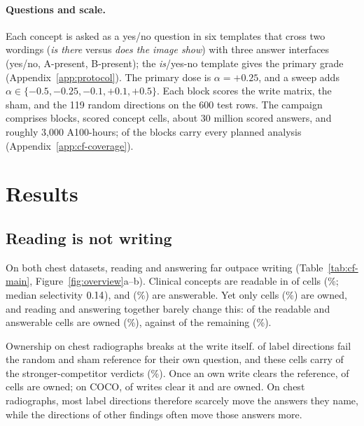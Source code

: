 \documentclass{article}
\begin{document}
\paragraph{Questions and scale.}
Each concept is asked as a yes/no question in six templates that cross two wordings (\emph{is there} versus \emph{does the image show}) with three answer interfaces (yes/no, A-present, B-present); the \emph{is}/yes-no template gives the primary grade (Appendix~\ref{app:protocol}). The primary dose is $\alpha=+0.25$, and a sweep adds $\alpha\in\{-0.5,-0.25,-0.1,+0.1,+0.5\}$. Each block scores the write matrix, the sham, and the 119 random directions on the 600 test rows. The campaign comprises \cfBlocks{} blocks, \cfCells{} scored concept cells, about 30 million scored answers, and roughly 3{,}000 A100-hours; \cfCoverageBlocksAllSeven{} of the \cfBlocks{} blocks carry every planned analysis (Appendix~\ref{app:cf-coverage}).

\section{Results}
\label{sec:results}

\subsection{Reading is not writing}
\label{sec:headline}

On both chest datasets, reading and answering far outpace writing (Table~\ref{tab:cf-main}, Figure~\ref{fig:overview}a--b). Clinical concepts are readable in \cfChestReadable{} of \cfChestReadableN{} cells (\cfChestReadablePct\%; median selectivity $0.14$), and \cfChestAnswerable{} (\cfChestAnswerablePct\%) are answerable. Yet only \cfChestOwned{} cells (\cfChestOwnedPct\%) are owned, and reading and answering together barely change this: \cfReadAnsOwned{} of the \cfReadAns{} readable and answerable cells are owned (\cfReadAnsOwnedPct\%), against \cfRestOwned{} of the remaining \cfRestN{} (\cfRestOwnedPct\%).

Ownership on chest radiographs breaks at the write itself. \cfChestRefBelow{} of \cfChestCellsN{} label directions fail the random and sham reference for their own question, and these cells carry \cfChestBelowStrong{} of the \cfChestCompetitor{} stronger-competitor verdicts (\cfChestBelowStrongPct\%). Once an own write clears the reference, \cfChestOwned{} of \cfChestRefMet{} cells are owned; on COCO, \cfCocoRefMet{} of \cfCocoOwnedN{} writes clear it and \cfCocoOwned{} are owned. On chest radiographs, most label directions therefore scarcely move the answers they name, while the directions of other findings often move those answers more.
\end{document}

